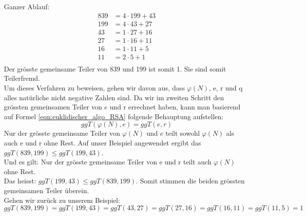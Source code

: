 %
Ganzer Ablauf:
\begin{equation}
  \begin{split}
    839 &= 4 \cdot 199 + 43\\
    199 &= 4 \cdot 43 + 27\\
    43 &= 1 \cdot 27 + 16\\
    27 &= 1 \cdot 16 + 11\\
    16 &= 1 \cdot 11 + 5\\
    11 &= 2 \cdot 5 + 1\\
    \label{eqn:euqulid_beweis}
  \end{split}
\end{equation}
%
Der grösste gemeinsame Teiler von 839 und 199 ist somit 1. Sie sind somit Teilerfremd. \\[2ex]
Um dieses Verfahren zu beweisen, gehen wir davon aus, dass $\varphi(N)$, e, r und q alles natürliche nicht negative Zahlen sind. Da wir im zweiten Schritt den grössten gemeinsamen Teiler von $e$ und r errechnet haben, kann man basierend auf Formel \ref{eqn:euklidischer_algo_RSA} folgende Behauptung aufstellen:
%
\begin{equation}
  ggT(\varphi(N),e) = ggT(e,r)
  \label{eqn:ggT}
\end{equation}
%
Nur der grösste gemeinsame Teiler von $\varphi(N)$ und $e$ teilt sowohl $\varphi(N)$ als auch e und r ohne Rest. Auf unser Beispiel angewendet ergibt das $ggT(839,199) \leq ggT(199,43)$.\\
Und es gilt: Nur der grösste gemeinsame Teiler von e und r teilt auch $\varphi(N)$ ohne Rest.\\
Das heisst: $ggT(199,43) \leq ggT(839,199)$.
Somit stimmen die beiden grössten gemeinsamen Teiler überein\cite{zahlentheorie_fuer_einsteiger}.\\[2ex]
Gehen wir zurück zu unserem Beispiel:
%
\begin{equation*}
 ggT(839,199) = ggT(199,43) = ggT(43,27) = ggT(27,16) = ggT(16,11) = ggT(11,5) = 1
\end{equation*}
%
